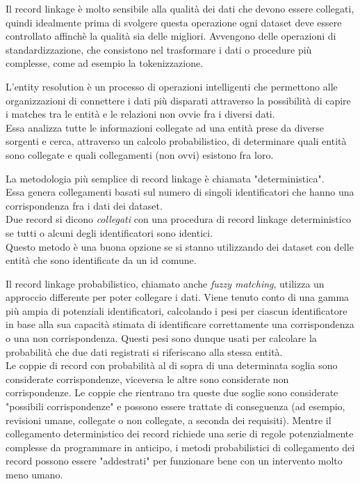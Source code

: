 \documentclass[a4paper,12pt]{article}
\begin{document}
\begin{description}[align=left]
	\item[Data preprocessing] Il record linkage è molto sensibile alla qualità dei dati che devono essere collegati, quindi idealmente prima di svolgere questa operazione ogni dataset deve essere controllato affinchè la qualità sia delle migliori. Avvengono delle operazioni di standardizzazione, che consistono nel trasformare i dati o procedure più complesse, come ad esempio la tokenizzazione.
	\item[Entity resolution] L'entity resolution è un processo di operazioni intelligenti che permettono alle organizzazioni di connettere i dati più disparati attraverso la possibilità di capire i matches tra le entità e le relazioni non ovvie fra i diversi dati.\\Essa analizza tutte le informazioni collegate ad una entità prese da diverse sorgenti e cerca, attraverso un calcolo probabilistico, di determinare quali entità sono collegate e quali collegamenti (non ovvi) esistono fra loro.
	\item[Deterministic record linkage] La metodologia più semplice di record linkage è chiamata "deterministica".\\Essa genera collegamenti basati sul numero di singoli identificatori che hanno una corrispondenza fra i dati dei dataset.\\Due record si dicono \textit{collegati} con una procedura di record linkage deterministico se tutti o alcuni degli identificatori sono identici.\\Questo metodo è una buona opzione se si stanno utilizzando dei dataset con delle entità che sono identificate da un id comune.
	\item[Probabilistic record linkage] Il record linkage probabilistico, chiamato anche \textit{fuzzy matching}, utilizza un approccio differente per poter collegare i dati. Viene tenuto conto di una gamma più ampia di potenziali identificatori, calcolando i pesi per ciascun identificatore in base alla sua capacità stimata di identificare correttamente una corrispondenza o una non corrispondenza. Questi pesi sono dunque usati per calcolare la probabilità che due dati registrati si riferiscano alla stessa entità.\\Le coppie di record con probabilità al di sopra di una determinata soglia sono considerate corrispondenze, viceversa le altre sono considerate non corrispondenze. Le coppie che rientrano tra queste due soglie sono considerate "possibili corrispondenze" e possono essere trattate di conseguenza (ad esempio, revisioni umane, collegate o non collegate, a seconda dei requisiti). Mentre il collegamento deterministico dei record richiede una serie di regole potenzialmente complesse da programmare in anticipo, i metodi probabilistici di collegamento dei record possono essere "addestrati" per funzionare bene con un intervento molto meno umano.

\end{description}
\end{document}
